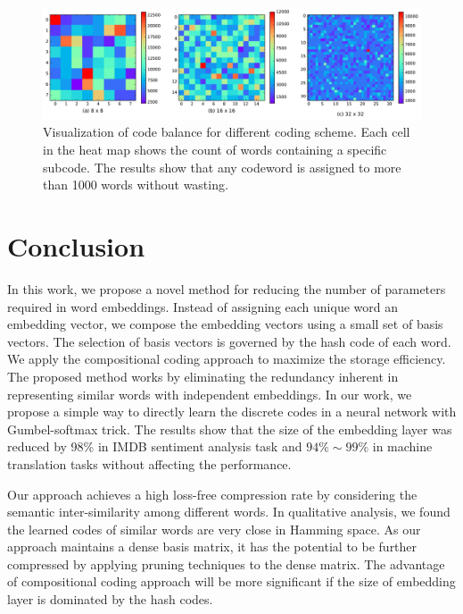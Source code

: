 \documentclass{article} %
\begin{document}

\begin{figure}[h]
  \centering
  \includegraphics[width=1.0\textwidth]{figures/code_learning_balance.pdf}
  \caption{Visualization of code balance for different coding scheme. Each cell in the heat map shows the count of words containing a specific subcode. The results show that any codeword is assigned to more than 1000 words without wasting. }
  \label{fig:balance}
\end{figure}


\section{Conclusion}

In this work, we propose a novel method for reducing the number of parameters required in word embeddings. Instead of assigning each unique word an embedding vector, we compose the embedding vectors using a small set of basis vectors. The selection of basis vectors is governed by the hash code of each word. We apply the compositional coding approach to maximize the storage efficiency. The proposed method works by eliminating the redundancy inherent in representing similar words with independent embeddings. In our work, we propose a simple way to directly learn the discrete codes in a neural network with Gumbel-softmax trick. The results show that the size of the embedding layer was reduced by 98\% in IMDB sentiment analysis task and $94\% \sim 99\%$ in machine translation tasks without affecting the performance.

Our approach achieves a high loss-free compression rate by considering the semantic inter-similarity among different words. In qualitative analysis, we found the learned codes of similar words are very close in Hamming space. As our approach maintains a dense basis matrix, it has the potential to be further compressed by applying pruning techniques to the dense matrix. The advantage of compositional coding approach will be more significant if the size of embedding layer is dominated by the hash codes.
\end{document}
